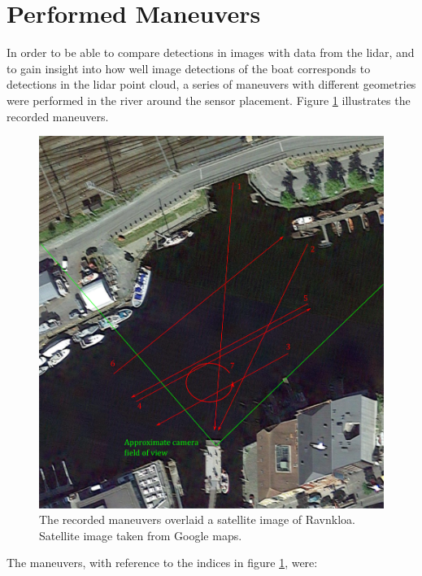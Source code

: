 \section{Performed Maneuvers}
In order to be able to compare detections in images with data from the lidar, and to gain insight into how well image detections of the boat corresponds to detections in the lidar point cloud, a series of maneuvers with different geometries were performed in the river around the sensor placement. Figure \ref{fig:experiments} illustrates the recorded maneuvers.
\begin{figure}[H]
	\centering
	\includegraphics[width=.8\linewidth]{fig/experiments_performed.png}
	\caption{The recorded maneuvers overlaid a satellite image of Ravnkloa. Satellite image taken from Google maps.}
	\label{fig:experiments}
\end{figure}
The maneuvers, with reference to the indices in figure \ref{fig:experiments}, were:
